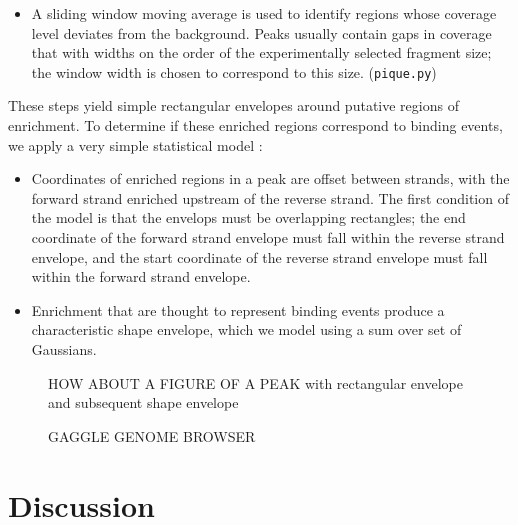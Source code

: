 \documentclass{bioinfo}
\begin{document}
\begin{methods}
\begin{itemize}
\item A sliding window moving average is used to identify regions
  whose coverage level deviates from the background. Peaks usually
  contain gaps in coverage that with widths on the order of the
  experimentally selected fragment size; the window width is chosen to
  correspond to this size. (\texttt{pique.py})



\end{itemize}

These steps yield simple rectangular envelopes around putative regions
of enrichment. To determine if these enriched regions correspond to
binding events, we apply a very simple statistical model :

\begin{itemize}

\item Coordinates of enriched regions in a peak are offset between
  strands, with the forward strand enriched upstream of the reverse
  strand. The first condition of the model is that the envelops must
  be overlapping rectangles; the end coordinate of the forward strand
  envelope must fall within the reverse strand envelope, and the
  start coordinate of the reverse strand envelope must fall within the
  forward strand envelope. 

\item Enrichment that are thought to represent binding events produce
  a characteristic shape envelope, which we model using a sum over set
  of Gaussians.

\end{itemize}

\end{methods}

\begin{figure}[!tfbd peak - a nice one]%
  \caption{HOW ABOUT A FIGURE OF A PEAK with rectangular envelope and
    subsequent shape envelope}\label{fig:01}
\end{figure}

\begin{figure}[!tfbd data - reasonable spot showing curation]%
\caption{GAGGLE GENOME BROWSER}\label{fig:02}
\end{figure}
\section{Discussion}
\end{document}
